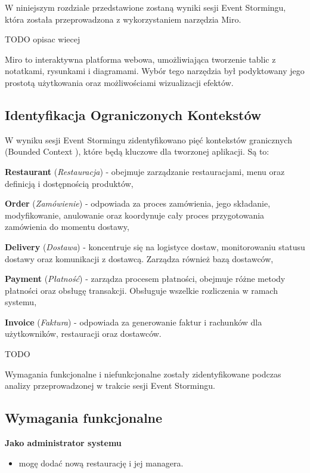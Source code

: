 W niniejszym rozdziale przedstawione zostaną wyniki sesji Event Stormingu, która została przeprowadzona z wykorzystaniem narzędzia Miro.

TODO opisac wiecej

Miro \cite{miro} to interaktywna platforma webowa, umożliwiająca tworzenie tablic z notatkami, rysunkami i diagramami. Wybór tego narzędzia był podyktowany jego prostotą użytkowania oraz możliwościami wizualizacji efektów.

\subsection{Identyfikacja Ograniczonych Kontekstów}

W wyniku sesji Event Stormingu zidentyfikowano pięć kontekstów granicznych (Bounded Context \cite{boundedcontext}), które będą kluczowe dla tworzonej aplikacji. Są to:

\textbf{Restaurant} (\textit{Restauracja}) - obejmuje zarządzanie restauracjami, menu oraz definicją i dostępnością produktów,

\textbf{Order} (\textit{Zamówienie}) - odpowiada za proces zamówienia, jego składanie, modyfikowanie, anulowanie oraz koordynuje cały proces przygotowania zamówienia do momentu dostawy,

\textbf{Delivery} (\textit{Dostawa}) - koncentruje się na logistyce dostaw, monitorowaniu statusu dostawy oraz komunikacji z dostawcą. Zarządza również bazą dostawców,

\textbf{Payment} (\textit{Płatność}) - zarządza procesem płatności, obejmuje różne metody płatności oraz obsługę transakcji. Obsługuje wszelkie rozliczenia w ramach systemu,

\textbf{Invoice} (\textit{Faktura}) - odpowiada za generowanie faktur i rachunków dla użytkowników, restauracji oraz dostawców.

TODO

Wymagania funkcjonalne i niefunkcjonalne zostały zidentyfikowane podczas analizy przeprowadzonej w trakcie sesji Event Stormingu.

\subsection{Wymagania funkcjonalne}

\textbf{Jako administrator systemu}
\begin{itemize}
    \item mogę dodać nową restaurację i jej managera.
\end{itemize}

